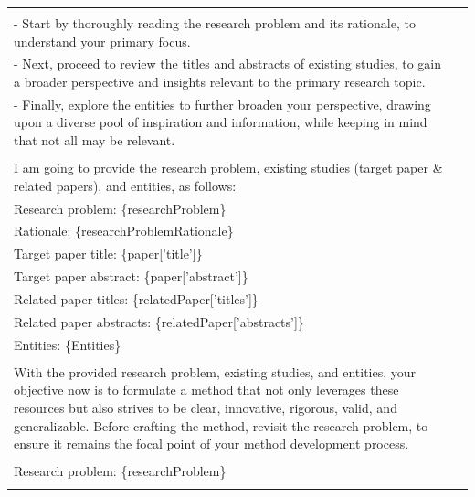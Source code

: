 \begin{table}
{\begin{tabular}{ll}
{            \multicolumn{1}{p{.92\textwidth}}{{Your approach should be systematic:}} \\ 
            \multicolumn{1}{p{.92\textwidth}}{{- Start by thoroughly reading the research problem and its rationale, to understand your primary focus.}} \\
            \multicolumn{1}{p{.92\textwidth}}{{- Next, proceed to review the titles and abstracts of existing studies, to gain a broader perspective and insights relevant to the primary research topic.}} \\
            \multicolumn{1}{p{.92\textwidth}}{{- Finally, explore the entities to further broaden your perspective, drawing upon a diverse pool of inspiration and information, while keeping in mind that not all may be relevant.}} \\ \\
            \multicolumn{1}{p{.92\textwidth}}{{I am going to provide the research problem, existing studies (target paper \& related papers), and entities, as follows: }} \\
            \multicolumn{1}{p{.92\textwidth}}{{Research problem: \{researchProblem\}}} \\
            \multicolumn{1}{p{.92\textwidth}}{{Rationale: \{researchProblemRationale\}}} \\
            \multicolumn{1}{p{.92\textwidth}}{{Target paper title: \{paper['title']\}}} \\
            \multicolumn{1}{p{.92\textwidth}}{{Target paper abstract: \{paper['abstract']\} }} \\
            \multicolumn{1}{p{.92\textwidth}}{{Related paper titles: \{relatedPaper['titles']\}}} \\
            \multicolumn{1}{p{.92\textwidth}}{{Related paper abstracts: \{relatedPaper['abstracts']\} }} \\
            \multicolumn{1}{p{.92\textwidth}}{{Entities: \{Entities\} }} \\ \\
            \multicolumn{1}{p{.92\textwidth}}{{With the provided research problem, existing studies, and entities, your objective now is to formulate a method that not only leverages these resources but also strives to be clear, innovative, rigorous, valid, and generalizable. Before crafting the method, revisit the research problem, to ensure it remains the focal point of your method development process.}} \\ \\
            \multicolumn{1}{p{.92\textwidth}}{{Research problem: \{researchProblem\}}} \\
}
\end{tabular}}
\end{table}
